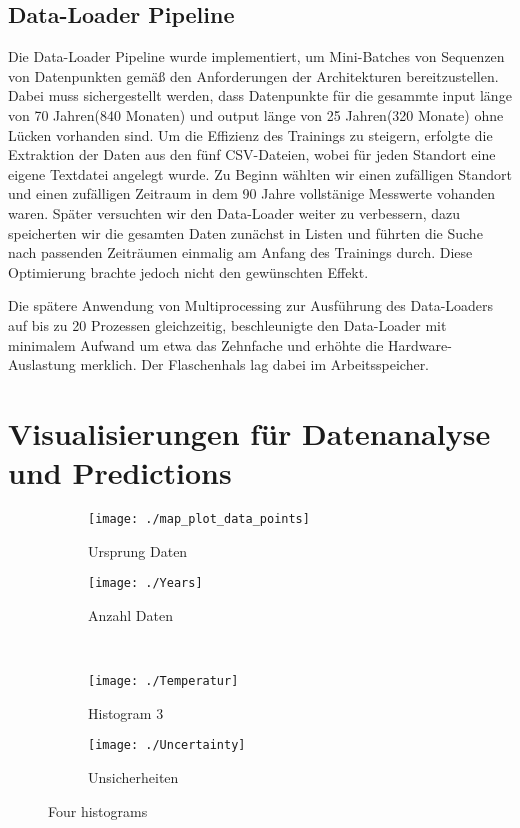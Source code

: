 \documentclass[manuscript,screen,review]{acmart} %
\begin{document}
\subsection{Data-Loader Pipeline} %
Die Data-Loader Pipeline wurde implementiert, um Mini-Batches von Sequenzen von Datenpunkten gemäß den Anforderungen der Architekturen bereitzustellen. Dabei muss sichergestellt werden, dass Datenpunkte für die gesammte input länge von 70 Jahren(840 Monaten) und output länge von 25 Jahren(320 Monate) ohne Lücken vorhanden sind.
Um die Effizienz des Trainings zu steigern, erfolgte die Extraktion der Daten aus den fünf CSV-Dateien, wobei für jeden Standort eine eigene Textdatei angelegt wurde. Zu Beginn wählten wir einen zufälligen Standort und einen zufälligen Zeitraum in dem 90 Jahre vollstänige Messwerte vohanden waren.
Später versuchten wir den Data-Loader weiter zu verbessern, dazu speicherten wir die gesamten Daten zunächst in Listen und führten die Suche nach passenden Zeiträumen einmalig am Anfang des Trainings durch. Diese Optimierung brachte jedoch nicht den gewünschten Effekt.

Die spätere Anwendung von Multiprocessing zur Ausführung des Data-Loaders auf bis zu 20 Prozessen gleichzeitig, beschleunigte den Data-Loader mit minimalem Aufwand um etwa das Zehnfache und erhöhte die Hardware-Auslastung merklich. Der Flaschenhals lag dabei im Arbeitsspeicher.


\section{Visualisierungen für Datenanalyse und Predictions}

\begin{figure}[htp]
  \centering
  \begin{subfigure}{.45\textwidth}
      \centering
      \texttt{[image: ./map\_plot\_data\_points]}
      \caption{Ursprung Daten}
      \label{fig:sub1}
  \end{subfigure}%
  \begin{subfigure}{.45\textwidth}
      \centering
      \texttt{[image: ./Years]}
      \caption{Anzahl Daten}
      \label{fig:sub2}
  \end{subfigure}\\
  \begin{subfigure}{.45\textwidth}
      \centering
      \texttt{[image: ./Temperatur]}
      \caption{Histogram 3}
      \label{fig:sub3}
  \end{subfigure}%
  \begin{subfigure}{.45\textwidth}
      \centering
      \texttt{[image: ./Uncertainty]}
      \caption{Unsicherheiten}
      \label{fig:sub4}
  \end{subfigure}
  \caption{Four histograms}
  \label{fig:test}
\end{figure}
\end{document}
